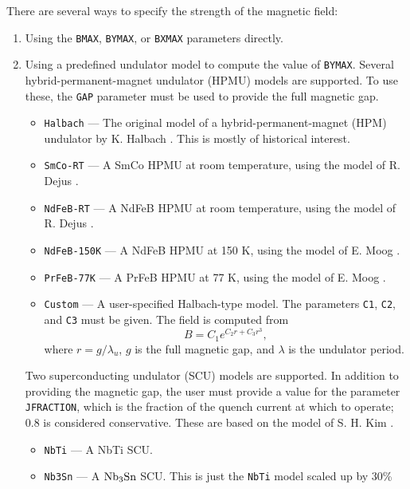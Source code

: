 There are several ways to specify the strength of the magnetic field:
\begin{enumerate}
\item Using the \verb|BMAX|, \verb|BYMAX|, or \verb|BXMAX| parameters directly.
\item Using a predefined undulator model to compute the value of \verb|BYMAX|. Several hybrid-permanent-magnet undulator (HPMU) models are supported. To use these, the \verb|GAP| parameter
      must be used to provide the full magnetic gap.
      \begin{itemize}
        \item \verb|Halbach| --- The original model of a hybrid-permanent-magnet (HPM) undulator by K. Halbach \cite{HalbachModel}. This is mostly of historical interest.
        \item \verb|SmCo-RT| --- A SmCo HPMU at room temperature, using the model of R. Dejus \cite{DejusModels}.
        \item \verb|NdFeB-RT| --- A NdFeB HPMU at room temperature, using the model of R. Dejus \cite{DejusModels}.
        \item \verb|NdFeB-150K| --- A NdFeB HPMU at 150 K, using the model of E. Moog \cite{MoogModels}.
        \item \verb|PrFeB-77K| --- A PrFeB HPMU at 77 K, using the model of E. Moog \cite{MoogModels}.
        \item \verb|Custom| --- A user-specified Halbach-type model. The parameters \verb|C1|, \verb|C2|, and \verb|C3| must be given. The field is computed from
        \begin{equation}
                B = C_1 e^{C_2 r + C_3 r^3},
        \end{equation}
        where $r = g/\lambda_u$, $g$ is the full magnetic gap, and $\lambda$ is the undulator period.
      \end{itemize}
      Two superconducting undulator (SCU) models are supported. In addition to providing the magnetic gap, the user must
      provide a value for the parameter \verb|JFRACTION|, which is the fraction of the quench current at which to
      operate; 0.8 is considered conservative. These are based on the model of S. H. Kim \cite{Kim-SCU-Scaling}.
      \begin{itemize}
        \item \verb|NbTi| --- A NbTi SCU.
        \item \verb|Nb3Sn| --- A ${\rm Nb_3 Sn}$ SCU.  This is just the \verb|NbTi| model scaled up by 30\% \cite{IvanyushenkovPC}
      \end{itemize}
\end{enumerate}
